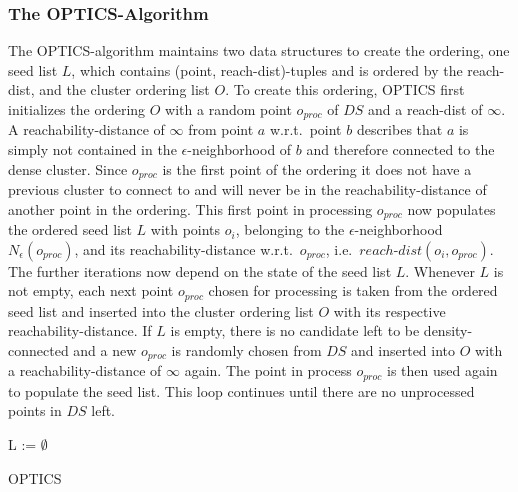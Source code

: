 \subsubsection*{The OPTICS-Algorithm} %
The OPTICS-algorithm maintains two data structures to create the ordering, one seed list $L$, which contains (point, reach-dist)-tuples and is ordered by the reach-dist, and the cluster ordering list $O$. 
To create this ordering, \ac{OPTICS} first initializes the ordering $O$ with a random point $o_{proc}$ of $DS$ and a reach-dist of $\infty$. A reachability-distance of $\infty$ from point $a$ w.r.t.\ point $b$ describes that $a$  is simply not contained in the $\epsilon$-neighborhood of $b$ and therefore connected to the dense cluster. Since $o_{proc}$ is the first point of the ordering it does not have a previous cluster to connect to and will never be in the reachability-distance of another point in the ordering. This first point in processing $o_{proc}$ now populates the ordered seed list $L$ with points $o_i$, belonging to the $\epsilon$-neighborhood $N_\epsilon(o_{proc})$, and its reachability-distance w.r.t.\ $o_{proc}$, i.e.\ $reach$-$dist(o_i, o_{proc})$. The further iterations now depend on the state of the seed list $L$. Whenever $L$ is not empty, each next point $o_{proc}$ chosen for processing is taken from the ordered seed list and inserted into the cluster ordering list $O$ with its respective reachability-distance. If $L$ is empty, there is no candidate left to be density-connected and a new $o_{proc}$ is randomly chosen from $DS$ and inserted into $O$ with a reachability-distance of $\infty$ again. The point in process $o_{proc}$ is then used again to populate the seed list. This loop continues until there are no unprocessed points in $DS$ left.



\begin{algorithm}[H]
\SetAlgoLined
{}
 L := $\emptyset$\;
 \caption{OPTICS}
\end{algorithm}

